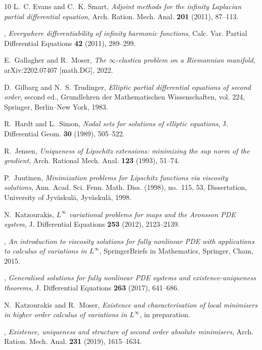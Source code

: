 \documentclass[a4paper]{article}
\theoremstyle{remark}
\begin{document}
\begin{thebibliography}{10}
L.~C. Evans and C.~K. Smart, \emph{Adjoint methods for the infinity {L}aplacian
  partial differential equation}, Arch. Ration. Mech. Anal. \textbf{201}
  (2011), 87--113.

\bysame, \emph{Everywhere differentiability of infinity harmonic functions},
  Calc. Var. Partial Differential Equations \textbf{42} (2011), 289--299.

E.~Gallagher and R.~Moser, \emph{The $\infty$-elastica problem on a
  {R}iemannian manifold}, arXiv:2202.07407 [math.DG], 2022.

D.~Gilbarg and N.~S. Trudinger, \emph{Elliptic partial differential equations
  of second order}, second ed., Grundlehren der Mathematischen Wissenschaften,
  vol. 224, Springer, Berlin--New York, 1983.

R.~Hardt and L.~Simon, \emph{Nodal sets for solutions of elliptic equations},
  J. Differential Geom. \textbf{30} (1989), 505--522.

R.~Jensen, \emph{Uniqueness of {L}ipschitz extensions: minimizing the sup norm
  of the gradient}, Arch. Rational Mech. Anal. \textbf{123} (1993), 51--74.

P.~Juutinen, \emph{Minimization problems for {L}ipschitz functions via
  viscosity solutions}, Ann. Acad. Sci. Fenn. Math. Diss. (1998), no.~115, 53,
  Dissertation, University of Jyv\"{a}skul\"{a}, Jyv\"{a}skul\"{a}, 1998.

N.~Katzourakis, \emph{{$L^\infty$} variational problems for maps and the
  {A}ronsson {PDE} system}, J. Differential Equations \textbf{253} (2012),
  2123--2139.

\bysame, \emph{An introduction to viscosity solutions for fully nonlinear {PDE}
  with applications to calculus of variations in {$L^\infty$}}, SpringerBriefs
  in Mathematics, Springer, Cham, 2015.

\bysame, \emph{Generalised solutions for fully nonlinear {PDE} systems and
  existence-uniqueness theorems}, J. Differential Equations \textbf{263}
  (2017), 641--686.

N.~Katzourakis and R.~Moser, \emph{Existence and characterisation of local
  minimisers in higher order calculus of variations in {$L^\infty$}}, in
  preparation.

\bysame, \emph{Existence, uniqueness and structure of second order absolute
  minimisers}, Arch. Ration. Mech. Anal. \textbf{231} (2019), 1615--1634.


\end{thebibliography}
\end{document}
